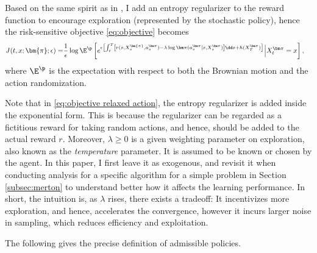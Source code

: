 Based on the same spirit as in \citet{wang2020reinforcement}, I add an entropy regularizer to the reward function to encourage  exploration (represented by the stochastic policy), hence the risk-sensitive objective \eqref{eq:objective} becomes
\begin{equation}
	\label{eq:objective relaxed action}
	\begin{aligned}
		J(t,x;\bm{\pi};\epsilon) = &	\frac{1}{\epsilon}\log\E^{\p}\left[e^{\epsilon \left[ \int_t^T \left[ r(s,X_s^{\bm{\pi}},a_s^{\bm \pi}) - \lambda \log\bm\pi(a_s^{\bm\pi}|s,X_s^{\bm\pi}) \right] \dd s + h(X_T^{\bm \pi}) \right]} \Big|X_t^{\bm \pi}= x\right],
	\end{aligned}
\end{equation}
where $\E^{\p}$ is the expectation with respect to both the Brownian motion and the action randomization. 


Note that in \eqref{eq:objective relaxed action}, the entropy regularizer is added inside the exponential form. This is because the regularizer can be regarded as a fictitious reward for taking random actions, and hence, should be added to the actual reward $r$. Moreover, $\lambda \geq 0$ is a given weighting parameter on exploration, also known as the {\it temperature} parameter. It is assumed to be known or chosen by the agent. In this paper, I first leave it as exogenous, and revisit it when conducting analysis for a specific algorithm for a simple problem in Section \ref{subsec:merton} to understand better how it affects the learning performance. In short, the intuition is, as $\lambda$ rises, there exists a tradeoff: It incentivizes more exploration, and hence, accelerates the convergence, however it incurs larger noise in sampling, which reduces efficiency and exploitation.




The following gives the precise definition of admissible policies.

